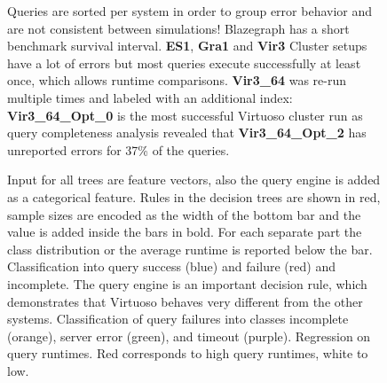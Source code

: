 \documentclass[twocolumn]{bmcart}%
\def\texttt{[image: ]}
\begin{document}
\begin{backmatter}
\begin{figure}[ht!]
	\centering
	\caption{
		Queries are sorted per system in order to group error behavior and are not consistent between simulations!
		Blazegraph has a short benchmark survival interval. \textbf{ES1}, \textbf{Gra1} and \textbf{Vir3} Cluster setups have a lot of errors but most queries execute successfully at least once, which allows runtime comparisons. \textbf{Vir3\_64} was re-run multiple times and labeled with an additional index: \textbf{Vir3\_64\_Opt\_0} is the most successful Virtuoso cluster run as query completeness analysis revealed that \textbf{Vir3\_64\_Opt\_2} has unreported errors for 37\% of the queries.
	}
	\label{fig:Fig09_FailuresOntoforceBM}
\end{figure}   

\begin{figure}[ht!]
	\centering
	\caption{ Input for all trees are feature vectors, also the query engine is added as a categorical feature. Rules in the decision trees are shown in red, sample sizes are encoded as the width of the bottom bar and the value is added inside the bars in bold. For each separate part the class distribution or the average runtime is reported below the bar. 
		\newline \hspace{\linewidth} 	
		\underline{} Classification into query success (blue) and failure (red) and incomplete. The query engine is an important decision rule, which demonstrates that Virtuoso behaves very different from the other systems.  
		\newline \hspace{\linewidth} 	
		\underline{} Classification of query failures into classes incomplete (orange), server error (green), and timeout (purple). 
		\newline \hspace{\linewidth} 	
		\underline{}  Regression on query runtimes. Red corresponds to high query runtimes, white to low. }
	\label{fig:Fig10_AllTrees}
\end{figure}


\end{backmatter}
\end{document}

